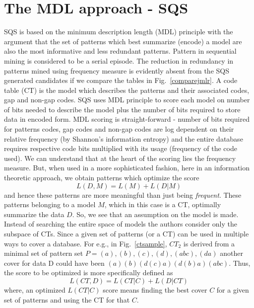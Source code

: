 \documentclass[10pt]{article}
\begin{document}
\section{The MDL approach - SQS}
\par SQS is based on the minimum description length (MDL) principle with the argument that the set of patterns which best summarize (encode) a model are also the most informative and less redundant patterns. Pattern in sequential mining is considered to be a serial episode. The reduction in redundancy in patterns mined using frequency measure is evidently absent from the SQS generated candidates if we compare the tables in Fig.~\ref{comparejmlr}. A code table (CT) is the model which describes the patterns and their associated codes, gap and non-gap codes. SQS uses MDL principle to score each model on number of bits needed to describe the model plus the number of bits required to store data in encoded form. MDL scoring is straight-forward - number of bits required for patterns codes, gap codes and non-gap codes are log dependent on their relative frequency (by Shannon's information entropy) and the entire database requires respective code bits multiplied with its usage (frequency of the code used). We can understand that at the heart of the scoring lies the frequency measure. But, when used in a more sophisticated fashion, here in an information theoretic approach, we obtain patterns which optimize the score 
\begin{equation}
L(D,M) = L(M) + L(D|M)
\end{equation} 
and hence these patterns are more meaningful than just being \textit{frequent}. These patterns belonging to a model $M$, which in this case is a CT, optimally summarize the data $D$. So, we see that an assumption on the model is made. Instead of searching the entire space of models the authors consider only the subspace of CTs. Since a given set of patterns (or a CT) can be used in multiple ways to cover a database. For e.g., in Fig.~\ref{ctsample}, $CT_2$ is derived from a minimal set of pattern set $P={(a), (b), (c), (d), (abc), (da)}$ another cover for data D could have been {$(a)(b)(d(c)a)(d(b)a)(abc)$}. Thus, the score to be optimized is more specifically defined as
\begin{equation}
L(CT, D) = L(CT|C) + L(D|CT)
\end{equation}
where, an optimized $L(CT|C)$ score means finding the best cover $C$ for a given set of patterns and using the CT for that $C$.
\end{document}

